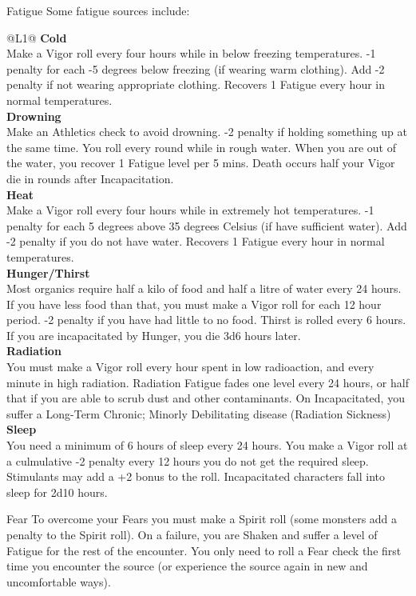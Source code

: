 \begin{genericsection}{Fatigue}
Some fatigue sources include:
\begin{redtable}{\linewidth}{@{}L{1}@{}}
  \textbf{Cold}\\
  Make a Vigor roll every four hours while in below freezing temperatures. -1 penalty for each -5 degrees below freezing (if wearing warm clothing). Add -2 penalty if not wearing appropriate clothing. Recovers 1 Fatigue every hour in normal temperatures.\\
  \textbf{Drowning}\\
  Make an Athletics check to avoid drowning. -2 penalty if holding something up at the same time. You roll every round while in rough water. When you are out of the water, you recover 1 Fatigue level per 5 mins. Death occurs half your Vigor die in rounds after Incapacitation.\\
  \textbf{Heat}\\
  Make a Vigor roll every four hours while in extremely hot temperatures. -1 penalty for each 5 degrees above 35 degrees Celsius (if have sufficient water). Add -2 penalty if you do not have water. Recovers 1 Fatigue every hour in normal temperatures.\\
  \textbf{Hunger/Thirst}\\
  Most organics require half a kilo of food and half a litre of water every 24 hours. If you have less food than that, you must make a Vigor roll for each 12 hour period. -2 penalty if you have had little to no food. Thirst is rolled every 6 hours. If you are incapacitated by Hunger, you die 3d6 hours later.\\
  \textbf{Radiation}\\
  You must make a Vigor roll every hour spent in low radioaction, and every minute in high radiation. Radiation Fatigue fades one level every 24 hours, or half that if you are able to scrub dust and other contaminants. On Incapacitated, you suffer a Long-Term Chronic; Minorly Debilitating disease (Radiation Sickness)\\
  \textbf{Sleep}\\
  You need a minimum of 6 hours of sleep every 24 hours. You make a Vigor roll at a culmulative -2 penalty every 12 hours you do not get the required sleep. Stimulants may add a +2 bonus to the roll. Incapacitated characters fall into sleep for 2d10 hours.
\end{redtable}
\end{genericsection}

\begin{genericsection}{Fear}
To overcome your Fears you must make a Spirit roll (some monsters add a penalty to the Spirit roll). On a failure, you are Shaken and suffer a level of Fatigue for the rest of the encounter. You only need to roll a Fear check the first time you encounter the source (or experience the source again in new and uncomfortable ways).
\end{genericsection}

